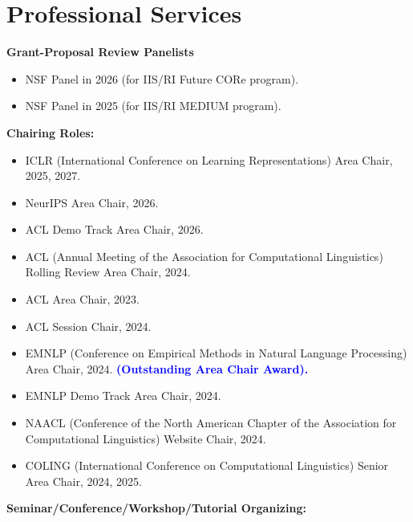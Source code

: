 
\section{Professional Services}



\noindent \textbf{Grant-Proposal Review Panelists}


\begin{itemize}[label={},leftmargin=15pt]
\item NSF Panel in 2026 (for IIS/RI Future CORe program).
\item NSF Panel in 2025 (for IIS/RI MEDIUM program).

\end{itemize}



\noindent \textbf{Chairing Roles:}

\begin{itemize}[label={},leftmargin=15pt]
\item ICLR (International Conference on Learning Representations) Area Chair, 2025, 2027.
\item NeurIPS Area Chair, 2026.
\item ACL Demo Track Area Chair, 2026.
\item ACL (Annual Meeting of the Association for Computational Linguistics) Rolling Review Area Chair, 2024.
\item ACL Area Chair, 2023.
\item ACL Session Chair, 2024.
\item EMNLP (Conference on Empirical Methods in Natural Language Processing) Area Chair, 2024. \textbf{\textcolor{blue}{(Outstanding Area Chair Award).}}
\item EMNLP Demo Track Area Chair, 2024.
\item NAACL (Conference of the North American Chapter of the Association for Computational Linguistics) Website Chair, 2024.
\item COLING (International Conference on Computational Linguistics) Senior Area Chair, 2024, 2025.
\end{itemize}



\noindent \textbf{Seminar/Conference/Workshop/Tutorial Organizing:}

